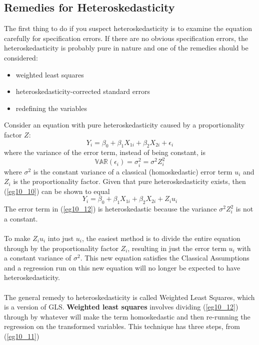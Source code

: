 \documentclass[11pt]{article}
\begin{document}
\subsection{Remedies for Heteroskedasticity}
The first thing to do if you suspect heteroskedasticity is to examine the equation carefully for specification errors. If there are no obvious specification errors, the heteroskedasticity is probably pure in nature and one of the remedies should be considered:
\begin{itemize}
\item weighted least squares
\item heteroskedasticity-corrected standard errors
\item redefining the variables
\end{itemize}
Consider an equation with pure heteroskedasticity caused by a proportionality factor $Z$:
\begin{equation}
Y_i = \beta_0 + \beta_1X_{1i} + \beta_2X_{2i} + \epsilon_i \label{eg10_10}
\end{equation}
where the variance of the error term, instead of being constant, is 
\begin{equation}
\mathbb{VAR}(\epsilon_i) = \sigma_i^2 = \sigma^2Z_i^2 \label{eg10_11}
\end{equation}
where $\sigma^2$ is the constant variance of a classical (homoskedastic) error term $u_i$ and $Z_i$ is the proportionality factor. Given that pure heteroskedasticity exists, then (\ref{eg10_10}) can be shown to equal
\begin{equation}
Y_i = \beta_0 + \beta_1X_{1i} + \beta_2X_{2i} + Z_iu_i \label{eg10_12}
\end{equation}
The error term in (\ref{eg10_12}) is heteroskedastic because the variance $\sigma^2Z_i^2$ is not a constant. \\ \\
To make $Z_iu_i$ into just $u_i$, the easiest method is to divide the entire equation through by the proportionality factor $Z_i$, resulting in just the error term $u_i$ with a constant variance of $\sigma^2$. This new equation satisfies the Classical Assumptions and a regression run on this new equation will no longer be expected to have heteroskedasticity.\\ \\
The general remedy to heteroskedasticity is called Weighted Least Squares, which is a version of GLS. \textbf{Weighted least squares} involves dividing (\ref{eg10_12}) through by whatever will make the term homoskedastic and then re-running the regression on the transformed variables. This technique has three steps, from (\ref{eg10_11})
\end{document}
